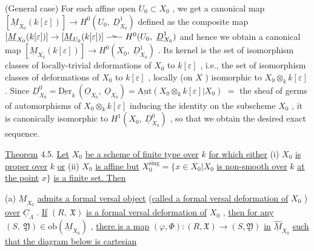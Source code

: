 (General case)  For each affine open  $U_{0} \subset X_{0}$ , we get a canonical map $[\underline{M}_{X_{0}}(k[\varepsilon])] \to H^{0}(U_{0},\ \underline{D}^{1}_{X_{0}})$  defined as the composite map $[\underline{M}_{X_{0}}(k[\varepsilon])] \to [\underline{M}_{U_{0}}(k[\varepsilon])] \overset{\sim}{\relbar\joinrel\relbar\joinrel\relbar} H^{0}(U_{0},\ \underline{D}^{1}_{X_{0}})$  and hence we obtain a canonical map $[\underline{M}_{X_{0}}(k[\varepsilon])] \to H^{0}(X_{0},\ \underline{D}^{1}_{X_{0}})$ . Its kernel is the set of isomorphism classes of locally-trivial deformations of  $X_{0}$  to  $k[\varepsilon]$ , i.e., the set of isomorphism classes of deformations of  $X_{0}$  to  $k[\varepsilon]$ , locally (on $X$ ) isomorphic to $X_{0} \otimes_{k} k[\varepsilon]$ . Since  $\underline{D}^{0}_{X_{0}} = \underline{\mathrm{Der}}_{k}\,(\underline{O}_{X_{0}},\ \underline{O}_{X_{0}}) = \underline{\mathrm{Aut}}(X_{0} \otimes_{k} k[\varepsilon]|X_{0})$  $=$ the sheaf of germs of automorphisms of  $X_{0} \otimes_{k} k[\varepsilon]$  inducing the identity on the subscheme $X_{0}$ , it is canonically isomorphic to  $H^{1}(X_{0},\ \underline{D}^{0}_{X_{0}})$ , so that we obtain the desired exact sequence.

\underline{Theorem} 4.5.  \underline{Let} $X_{0}$ \underline{be a scheme of finite type over} $k$ \underline{for which either} (i) $X_{0}$ \underline{is proper over} $k$ \underline{or} (ii) $X_{0}$ \underline{is affine but} $X_{0}^{\mathrm{sing}} = \{x \in X_{0}|X_{0}$ \underline{is non-smooth over} $k$ \underline{at the point} $x \}$ \underline{is a finite set. Then}

(a)  $\underline{M}_{X_{0}}$  \underline{admits a formal versal object} (\underline{called a formal versal deformation of}  $X_{0}$ ) \underline{over}  $\underline{C}_{\Lambda}$ . \underline{If}  $(R,\ \mathfrak{X})$  \underline{is a formal versal deformation of}  $X_{0}$ , \underline{then for any} $(S,\ \mathfrak{Y}) \in \mathrm{ob}(\widehat{\underline{M}}_{X_{0}})$ , \underline{there is a map}  $(\varphi,\Phi) : (R,\mathfrak{X}) \to (S,\mathfrak{Y})$  \underline{in}  $\widehat{\underline{M}}_{X_{0}}$  \underline{such that the diagram below is cartesian}

